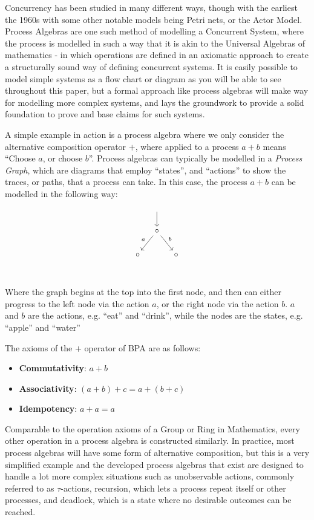 \documentclass[logo,bsc,singlespacing,parskip,online]{infthesis}
\begin{document}
\begin{preliminary}
Concurrency has been studied in many different ways, though with the earliest  the 1960s with some other notable models being Petri nets, or the Actor Model. Process Algebras are one such method of modelling a Concurrent System, where the process is modelled in such a way that it is akin to the Universal Algebras of mathematics - in which operations are defined in an axiomatic approach to create a structurally sound way of defining concurrent systems. \citep{baeten_brief_2005} It is easily possible to model simple systems as a flow chart or diagram as you will be able to see throughout this paper, but a formal approach like process algebras will make way for modelling more complex systems, and lays the groundwork to provide a solid foundation to prove and base claims for such systems.

A simple example in action is a process algebra where we only consider the alternative composition operator $+$, where applied to a process $a + b$ means ``Choose $a$, or choose $b$''. Process algebras can typically be modelled in a \textit{Process Graph}, which are diagrams that employ ``states'', and ``actions'' to show the traces, or paths, that a process can take. In this case, the process $a + b$ can be modelled in the following way:

\[\begin{tikzcd}[cramped,column sep=small]
	& {} \\
	& \circ \\
	\circ && \circ \\
	\arrow[from=1-2, to=2-2]
	\arrow["a"', from=2-2, to=3-1]
	\arrow["b", from=2-2, to=3-3]
\end{tikzcd}\]

Where the graph begins at the top into the first node, and then can either progress to the left node via the action $a$, or the right node via the action $b$. $a$ and $b$ are the actions, e.g. ``eat'' and ``drink'', while the nodes are the states, e.g. ``apple'' and ``water''

The axioms of the $+$ operator of BPA are as follows:
\begin{itemize}
    \item \textbf{Commutativity}: $a + b$
    \item \textbf{Associativity}: $(a + b) + c = a + (b + c)$
    \item \textbf{Idempotency}: $a + a = a$
\end{itemize}
Comparable to the operation axioms of a Group or Ring in Mathematics, every other operation in a process algebra is constructed similarly. In practice, most process algebras will have some form of alternative composition, but this is a very simplified example and the developed process algebras that exist are designed to handle a lot more complex situations such as unobservable actions, commonly referred to as $\tau$-actions, recursion, which lets a process repeat itself or other processes, and deadlock, which is a state where no desirable outcomes can be reached.


\end{preliminary}
\end{document}
